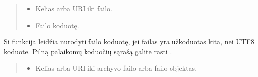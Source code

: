 \documentclass[letterpaper,10pt,lithuanian]{sphinxmanual}
\begin{document}
\begin{fulllineitems}

\pysigstartsignatures
\pysigline
{}
\pysigstopsignatures{}

\begin{fulllineitems}
\label{\detokenize{formules:file}}
\pysigstartsignatures
\pysiglinewithargsret
{}
{\sphinxparamcomma {}}
{}
\pysigstopsignatures\begin{quote}\begin{description}
\begin{itemize}
\item {} 
\sphinxAtStartPar
{} \sphinxhyphen{}\sphinxhyphen{} Kelias arba URI iki failo.

\item {} 
\sphinxAtStartPar
{} \sphinxhyphen{}\sphinxhyphen{} Failo koduotę.

\end{itemize}

\end{description}\end{quote}

\sphinxAtStartPar
Ši funkcija leidžia nurodyti failo koduotę, jei failas yra užkoduotas
kita, nei UTF\sphinxhyphen{}8 koduote. Pilną palaikomų koduočių sąrašą galite rasti
.

\end{fulllineitems}


\begin{fulllineitems}
\label{\detokenize{formules:extract}}
\pysigstartsignatures
\pysiglinewithargsret
{}
{\sphinxparamcomma {}}
{}
\pysigstopsignatures\begin{quote}\begin{description}
\begin{itemize}
\item {} 
\sphinxAtStartPar
{} \sphinxhyphen{}\sphinxhyphen{} Kelias arba URI iki archyvo failo arba failo objektas.


\end{itemize}
\end{description}
\end{quote}
\end{fulllineitems}
\end{fulllineitems}
\end{document}
